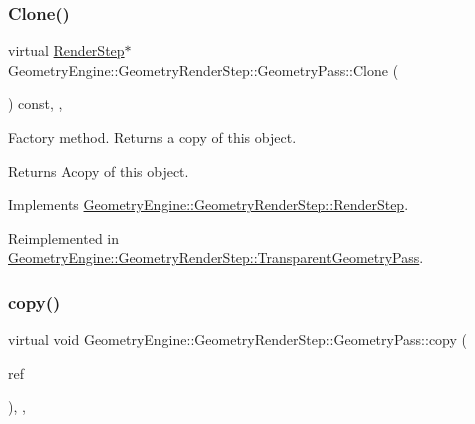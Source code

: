 \subsubsection{\texorpdfstring{Clone()}{Clone()}}
{\footnotesize\ttfamily virtual \mbox{\hyperlink{class_geometry_engine_1_1_geometry_render_step_1_1_render_step}{Render\+Step}}$\ast$ Geometry\+Engine\+::\+Geometry\+Render\+Step\+::\+Geometry\+Pass\+::\+Clone (\begin{DoxyParamCaption}{ }\end{DoxyParamCaption}) const\hspace{0.3cm}{\ttfamily [inline]}, {\ttfamily [override]}, {\ttfamily [virtual]}}

Factory method. Returns a copy of this object. \begin{DoxyReturn}{Returns}
Acopy of this object. 
\end{DoxyReturn}


Implements \mbox{\hyperlink{class_geometry_engine_1_1_geometry_render_step_1_1_render_step_afe33ea9d82c5be11f55af7d39691d44b}{Geometry\+Engine\+::\+Geometry\+Render\+Step\+::\+Render\+Step}}.



Reimplemented in \mbox{\hyperlink{class_geometry_engine_1_1_geometry_render_step_1_1_transparent_geometry_pass_a6bfc83f45b84112bbf1beda1ed8e5466}{Geometry\+Engine\+::\+Geometry\+Render\+Step\+::\+Transparent\+Geometry\+Pass}}.

\mbox{\label{class_geometry_engine_1_1_geometry_render_step_1_1_geometry_pass_ae69b08dfd47ccfcc3888ca53511b660d}} 
\subsubsection{\texorpdfstring{copy()}{copy()}}
{\footnotesize\ttfamily virtual void Geometry\+Engine\+::\+Geometry\+Render\+Step\+::\+Geometry\+Pass\+::copy (\begin{DoxyParamCaption}\item[{const \mbox{\hyperlink{class_geometry_engine_1_1_geometry_render_step_1_1_geometry_pass}{Geometry\+Pass}} \&}]{ref }\end{DoxyParamCaption})\hspace{0.3cm}{\ttfamily [inline]}, {\ttfamily [protected]}, {\ttfamily [virtual]}}

